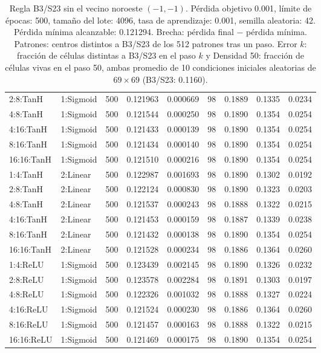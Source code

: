 \begin{table}[H]
\begin{tabular}{llrrrrrrr}
		2:8:TanH & 1:Sigmoid & 500 & 0.121963 & 0.000669 & 98 & 0.1889 & 0.1335 & 0.0234 \\
		4:8:TanH & 1:Sigmoid & 500 & 0.121544 & 0.000250 & 98 & 0.1890 & 0.1354 & 0.0254 \\
		4:16:TanH & 1:Sigmoid & 500 & 0.121433 & 0.000139 & 98 & 0.1890 & 0.1354 & 0.0254 \\
		8:16:TanH & 1:Sigmoid & 500 & 0.121434 & 0.000140 & 98 & 0.1890 & 0.1354 & 0.0254 \\
		16:16:TanH & 1:Sigmoid & 500 & 0.121510 & 0.000216 & 98 & 0.1890 & 0.1354 & 0.0254 \\
		\midrule
		1:4:TanH & 2:Linear & 500 & 0.122987 & 0.001693 & 98 & 0.1890 & 0.1302 & 0.0192 \\
		2:8:TanH & 2:Linear & 500 & 0.122124 & 0.000830 & 98 & 0.1890 & 0.1323 & 0.0203 \\
		4:8:TanH & 2:Linear & 500 & 0.121537 & 0.000243 & 98 & 0.1888 & 0.1322 & 0.0215 \\
		4:16:TanH & 2:Linear & 500 & 0.121453 & 0.000159 & 98 & 0.1887 & 0.1339 & 0.0238 \\
		8:16:TanH & 2:Linear & 500 & 0.121432 & 0.000138 & 98 & 0.1890 & 0.1354 & 0.0254 \\
		16:16:TanH & 2:Linear & 500 & 0.121528 & 0.000234 & 98 & 0.1886 & 0.1364 & 0.0260 \\
		\midrule
		1:4:ReLU & 1:Sigmoid & 500 & 0.123439 & 0.002145 & 98 & 0.1890 & 0.1326 & 0.0232 \\
		2:8:ReLU & 1:Sigmoid & 500 & 0.123578 & 0.002284 & 98 & 0.1891 & 0.1303 & 0.0197 \\
		4:8:ReLU & 1:Sigmoid & 500 & 0.122326 & 0.001032 & 98 & 0.1888 & 0.1327 & 0.0224 \\
		4:16:ReLU & 1:Sigmoid & 500 & 0.121524 & 0.000230 & 98 & 0.1886 & 0.1364 & 0.0260 \\
		8:16:ReLU & 1:Sigmoid & 500 & 0.121457 & 0.000163 & 98 & 0.1888 & 0.1322 & 0.0215 \\
		16:16:ReLU & 1:Sigmoid & 500 & 0.121469 & 0.000175 & 98 & 0.1890 & 0.1354 & 0.0254 \\
		\bottomrule
	\end{tabular}
	\caption{Regla B3/S23 sin el vecino noroeste $(-1,-1)$. Pérdida objetivo 0.001, límite de épocas: 500, tamaño del lote: 4096, tasa de aprendizaje: 0.001, semilla aleatoria: 42. Pérdida mínima alcanzable: 0.121294. Brecha: pérdida final $-$ pérdida mínima. Patrones: centros distintos a B3/S23 de los 512 patrones tras un paso. Error $k$: fracción de células distintas a B3/S23 en el paso $k$ y Densidad 50: fracción de células vivas en el paso 50, ambas promedio de 10 condiciones iniciales aleatorias de $69\times69$ (B3/S23: 0.1160).}
	\label{tab:vecindad_no}
\end{table}
